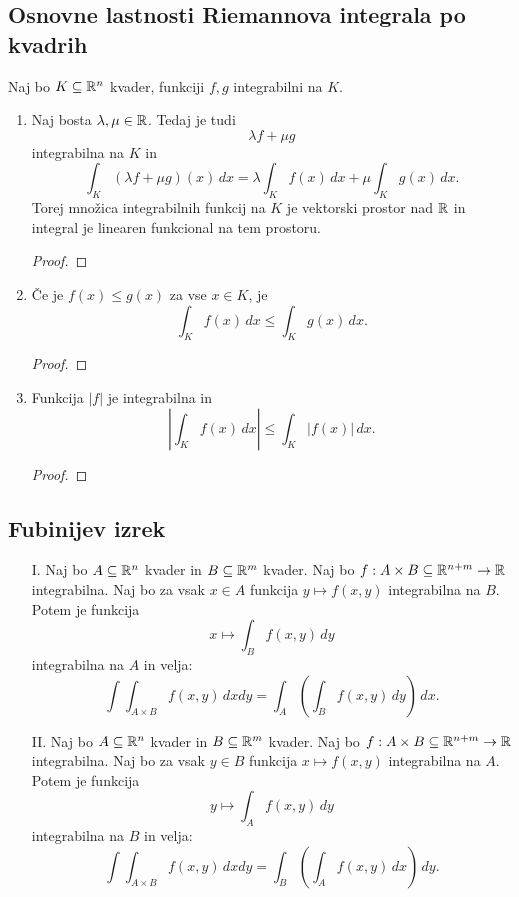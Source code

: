 \subsection{Osnovne lastnosti Riemannova integrala po kvadrih}
Naj bo \(K \subseteq \mathbb{R}^n\) kvader, funkciji \(f, g\) integrabilni na \(K\).
\begin{enumerate}
    \item Naj bosta \(\lambda, \mu \in \mathbb{R}\). Tedaj je tudi 
    \[\lambda f + \mu g\]
    integrabilna na \(K\) in
    \[\int_K (\lambda f + \mu g)(x) \, dx = \lambda \int_K f(x) \, dx + \mu  \int_K g(x) \, dx.\]
    Torej množica integrabilnih funkcij na \(K\) je vektorski prostor nad \(\mathbb{R}\) in integral je linearen funkcional na tem prostoru.
    \begin{proof}
        \todo
    \end{proof}
    \item Če je \(f(x) \leq g(x)\) za vse \(x \in K\), je \[\int_K f(x) \, dx \leq \int_K g(x) \, dx.\]
    \begin{proof}
        \todo   
    \end{proof}
    \item Funkcija \(|f|\) je integrabilna in \[\left|\int_K f(x) \, dx\right| \leq \int_K |f(x)| \, dx.\]
    \begin{proof}
        \todo
    \end{proof}
\end{enumerate}

\newpage
\subsection{Fubinijev izrek}
\begin{enumerate}
    \item[I.] Naj bo \(A \subseteq \mathbb{R}^n\) kvader in \(B \subseteq \mathbb{R}^m\) kvader. Naj bo \(f: A \times B \subseteq \mathbb{R}^{n+m} \to \mathbb{R}\) integrabilna. Naj bo za vsak \(x \in A\) funkcija \(y \mapsto f(x,y)\) integrabilna na \(B\). Potem je funkcija \[x \mapsto \int_B f(x,y) \, dy\]
    integrabilna na \(A\) in velja: \[\int \int_{A \times B} f(x,y) \, dxdy = \int_A \left(\int_B f(x,y) \, dy\right) \, dx.\]
    \item[II.] Naj bo \(A \subseteq \mathbb{R}^n\) kvader in \(B \subseteq \mathbb{R}^m\) kvader. Naj bo \(f: A \times B \subseteq \mathbb{R}^{n+m} \to \mathbb{R}\) integrabilna. Naj bo za vsak \(y \in B\) funkcija \(x \mapsto f(x,y)\) integrabilna na \(A\). Potem je funkcija \[y \mapsto \int_A f(x,y) \, dy\]
    integrabilna na \(B\) in velja: \[\int \int_{A \times B} f(x,y) \, dxdy = \int_B \left(\int_A f(x,y) \, dx\right) \, dy.\]
\end{enumerate}

